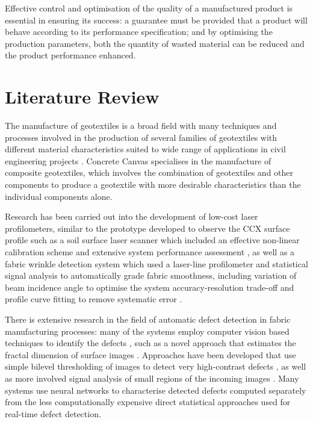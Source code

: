 \documentclass[12pt]{report}
\begin{document}
        Effective control and optimisation of the quality of a manufactured product is essential in ensuring its success: a guarantee must be provided that a product will behave according to its performance specification; and by optimising the production parameters, both the quantity of wasted material can be reduced and the product performance enhanced.


    \section{Literature Review}
        The manufacture of geotextiles is a broad field with many techniques and processes involved in the production of several families of geotextiles \cite{berube2016manufacturing} with different material characteristics suited to wide range of applications in civil engineering projects \cite{ingold2013geotextiles}. Concrete Canvas specialises in the manufacture of composite geotextiles, which involves the combination of geotextiles and other components to produce a geotextile with more desirable characteristics than the individual components alone.
        
        Research has been carried out into the development of low-cost laser profilometers, similar to the prototype developed to observe the CCX surface profile such as a soil surface laser scanner which included an effective non-linear calibration scheme and extensive system performance assessment \cite{Darboux2003}, as well as a fabric wrinkle detection system which used a laser-line profilometer and statistical signal analysis to automatically grade fabric smoothness, including variation of beam incidence angle to optimise the system accuracy-resolution trade-off and profile curve fitting to remove systematic error \cite{Xu1998}.
        
        There is extensive research in the field of automatic defect detection in fabric manufacturing processes: many of the systems employ computer vision based techniques to identify the defects \cite{kumar2008computer}, such as a novel approach that estimates the fractal dimension of surface images \cite{conci1998fractal}. Approaches have been developed that use simple bilevel thresholding of images to detect very high-contrast defects \cite{stojanovic2001real}\cite{norton1993machine}, as well as more involved signal analysis of small regions of the incoming images \cite{zhang1995fabric}\cite{huart1994integration}\cite{abou2008line}. Many systems use neural networks to characterise detected defects \cite{stojanovic2001real}\cite{wong2009stitching}\cite{karayiannis1999defect} computed separately from the less computationally expensive direct statistical approaches used for real-time defect detection.
        
\end{document}
